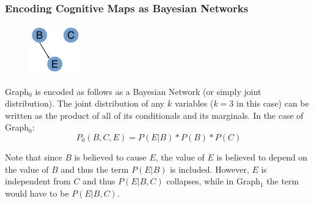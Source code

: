 \documentclass{beamer}
\begin{document}
\begin{frame}
\frametitle{Encoding Cognitive Maps as Bayesian Networks}
\begin{figure}

  \centering
    \includegraphics[width=0.2\textwidth]{Graph0.pdf}
\end{figure}

Graph$_0$ is encoded as follows as a Bayesian Network (or simply joint distribution). The joint distribution of any $k$ variables ($k=3$ in this case) can be written as the product of all of its conditionals and its marginals. In the case of Graph$_0$:
$$P_0(B, C, E)= P(E | B)*P(B)*P(C)$$

Note that since $B$ is believed to cause $E$, the value of $E$ is believed to depend on the value of $B$ and thus the term $P(E | B)$ is included. However, $E$ is independent from $C$ and thus $P(E | B, C)$ collapses, while in Graph$_1$ the term would have to be $P(E | B, C)$.
\end{frame}
\end{document}
